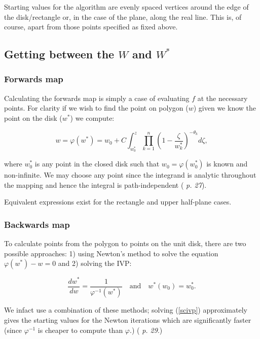 \documentclass[a4paper,10pt]{amsart}
\renewcommand{\phi}{\varphi}
\begin{document}
Starting values for the algorithm are evenly spaced vertices around the edge of the disk/rectangle or, in the case of the plane, along the real line. This is, of course, apart from those points specified as fixed above.

\subsection{Getting between the $W$ and $W^*$}

\subsubsection{Forwards map}

Calculating the forwards map is simply a case of evaluating $f$ at the necessary points. For clarity if we wish to find the point on polygon ($w$) given we know the point on the disk ($w^*$) we compute:

\begin{equation}
\label{forwardsmap}
w=\phi(w^*) = w_0 + C \int_{w^*_0}^{z} \prod_{k=1}^{n} (1 - \frac{\zeta}{w^*_k})^{-\theta_k} d\zeta,
\end{equation}

where $w^*_0$ is any point in the closed disk such that $w_0 = \phi(w^*_0)$ is known and non-infinite. We may choose any point since the integrand is analytic throughout the mapping and hence the integral is path-independent (\cite{driscoll} \emph{p. 27}).

Equivalent expressions exist for the rectangle and upper half-plane cases.


\subsubsection{Backwards map}

To calculate points from the polygon to points on the unit disk, there are two possible approaches: 1) using Newton's method to solve the equation $\phi(w^*)-w=0$ and 2) solving the IVP:

\begin{equation}
\label{scivp}
\frac{dw^*}{dw}=\frac{1}{\phi^{-1}(w^*)} \quad \text{and} \quad w^*(w_0)=w^*_0.
\end{equation}

We infact use a combination of these methods; solving (\ref{scivp}) approximately gives the starting values for the Newton iterations which are significantly faster (since $\phi^{-1}$ is cheaper to compute than $\phi$.) (\cite{driscoll} \emph{p. 29}.)
\end{document}
